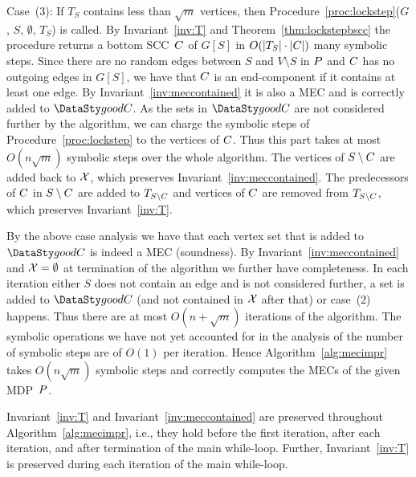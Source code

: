 \smallskip\noindent Case~(3): If $T_S$ contains less than $\sqrt{m}$ vertices, then 
Procedure~\ref{proc:lockstep}($G$, $S$, $\emptyset$, $T_S$) is called. 
By Invariant~\ref{inv:T} and Theorem~\ref{thm:lockstepbscc} the procedure
returns a bottom SCC~$C$ of $G[S]$ in $O(\lvert T_S \rvert \cdot \lvert C \rvert)$
many symbolic steps. Since there are no random edges between $S$ and $V\setminus S$
in $P$ and $C$ has no outgoing edges in $G[S]$, we have that $C$ is 
an end-component if it contains at least one edge. By Invariant~\ref{inv:meccontained}
it is also a MEC and is correctly added to $\goodC$. 
As the sets in $\goodC$ are not considered further by the algorithm, we can 
charge the symbolic steps of Procedure~\ref{proc:lockstep} to the vertices
of $C$. Thus this part takes at most $O(n \sqrt{m})$ symbolic steps over the 
whole algorithm. The vertices of 
$S \setminus C$ are added back to $\mathcal{X}$, which preserves 
Invariant~\ref{inv:meccontained}. The predecessors of $C$ in
$S \setminus C$  are added to $T_{S \setminus C}$ and vertices of $C$ 
are removed from $T_{S \setminus C}$, which preserves Invariant~\ref{inv:T}.

By the above case analysis we have that each vertex set that is added to 
$\goodC$ is indeed a MEC (soundness). By Invariant~\ref{inv:meccontained}
and $\mathcal{X} = \emptyset$ at termination of the algorithm we
further have completeness.
In each iteration either $S$ does not contain an edge and is not considered further,
a set is added to $\goodC$ (and not contained in $\mathcal{X}$ after that) or 
case~(2) happens. Thus there are at most $O(n + \sqrt{m})$ iterations
of the algorithm. The symbolic operations we have not yet accounted for in 
the analysis of the number of symbolic steps are of $O(1)$ per iteration. Hence
Algorithm~\ref{alg:mecimpr} takes $O(n \sqrt{m})$ symbolic steps and correctly
computes the MECs of the given MDP~$P$.

\begin{lemma}\label{lem:improvedmecinv}
Invariant~\ref{inv:T} and Invariant~\ref{inv:meccontained} are preserved throughout
Algorithm~\ref{alg:mecimpr}, i.e., they hold before the
first iteration, after each iteration, and after termination of the main while-loop. Further,
Invariant~\ref{inv:T} is preserved during each iteration of the main while-loop.
\end{lemma}

